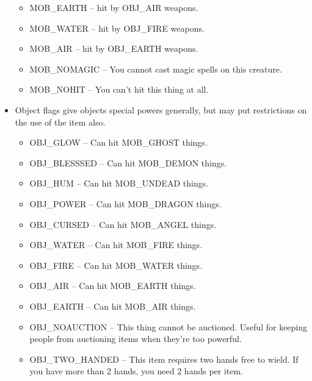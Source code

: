 \begin{itemize}
\begin{itemize}
\item MOB\_EARTH -- hit by OBJ\_AIR weapons.

\item MOB\_WATER -- hit by OBJ\_FIRE weapons.

\item MOB\_AIR -- hit by OBJ\_EARTH weapons.

\item MOB\_NOMAGIC -- You cannot cast magic spells on this creature.

\item MOB\_NOHIT -- You can't hit this thing at all.

\end{itemize}


\item Object flags give objects special powers generally, but may put
restrictions on the use of the item also.



\begin{itemize}

\item OBJ\_GLOW -- Can hit MOB\_GHOST things.

\item OBJ\_BLESSSED -- Can hit MOB\_DEMON things.


\item OBJ\_HUM -- Can hit MOB\_UNDEAD things.

\item OBJ\_POWER -- Can hit MOB\_DRAGON things.

\item OBJ\_CURSED -- Can hit MOB\_ANGEL things.

\item OBJ\_WATER -- Can hit MOB\_FIRE things.

\item OBJ\_FIRE -- Can hit MOB\_WATER things.

\item OBJ\_AIR -- Can hit MOB\_EARTH things.

\item OBJ\_EARTH -- Can hit MOB\_AIR things.

\item OBJ\_NOAUCTION -- This thing cannot be auctioned. Useful for
keeping people from auctioning items when they're too powerful.

\item OBJ\_TWO\_HANDED -- This item requires two hands free to wield. If
you have more than 2 hands, you need 2 hands per item.


\end{itemize}
\end{itemize}
